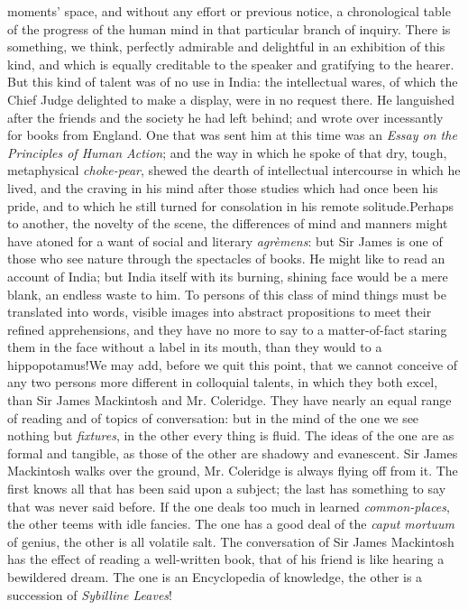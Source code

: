 moments' space, and without any effort or previous notice, a
chronological table of the progress of the human mind in that
particular branch of inquiry. There is something, we think,
perfectly admirable and delightful in an exhibition of this kind,
and which is equally creditable to the speaker and gratifying to
the hearer.  But this kind of talent was of no use in India: the
intellectual wares, of which the Chief Judge delighted to make a
display, were in no request there. He languished after the friends
and the society he had left behind; and wrote over incessantly for
books from England. One that was sent him at this time was an
\emph{Essay on the Principles of Human Action}; and the way in
which he spoke of that dry, tough, metaphysical \emph{choke-pear},
shewed the dearth of intellectual intercourse in which he lived,
and the craving in his mind after those studies which had once
been his pride, and to which he still turned for consolation in
his remote solitude.\textemdash Perhaps to another, the novelty of
the scene, the differences of mind and manners might have atoned
for a want of social and literary \emph{agrèmens}: but Sir James
is one of those who see nature through the spectacles of books. He
might like to read an account of India; but India itself with its
burning, shining face would be a mere blank, an endless waste to
him. To persons of this class of mind things must be translated
into words, visible images into abstract propositions to meet
their refined apprehensions, and they have no more to say to a
matter-of-fact staring them in the face without a label in its
mouth, than they would to a hippopotamus!\textemdash We may add,
before we quit this point, that we cannot conceive of any two
persons more different in colloquial talents, in which they both
excel, than Sir James Mackintosh and Mr. Coleridge. They have
nearly an equal range of reading and of topics of conversation:
but in the mind of the one we see nothing but \emph{fixtures}, in
the other every thing is fluid. The ideas of the one are as formal
and tangible, as those of the other are shadowy and
evanescent. Sir James Mackintosh walks over the ground,
Mr. Coleridge is always flying off from it. The first knows all
that has been said upon a subject; the last has something to say
that was never said before. If the one deals too much in learned
\emph{common-places}, the other teems with idle fancies. The one
has a good deal of the \emph{caput mortuum} of genius, the other
is all volatile salt. The conversation of Sir James Mackintosh has
the effect of reading a well-written book, that of his friend is
like hearing a bewildered dream. The one is an Encyclopedia of
knowledge, the other is a succession of \emph{Sybilline Leaves}!

